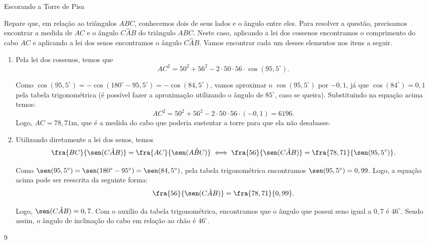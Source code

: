 \begin{answer}{Escorando a Torre de Pisa}
{
Repare que, em relação ao triângulos $ABC$, conhecemos dois de seus lados e o ângulo entre eles. Para resolver a questão, precisamos encontrar a medida de $AC$ e o ângulo $C\hat{A}B$ do triângulo $ABC$. Neste caso,  aplicando a lei dos cossenos encontramos o comprimento do cabo $AC$ e aplicando a lei dos senos encontramos o ângulo $C\hat{A}B$. Vamos encontrar cada um desses elementos nos itens a seguir.

\begin{enumerate}
    \item{}
    Pela lei dos cossenos, temos que 
    $$AC^2=50^2+56^2-2\cdot50\cdot56\cdot\cos(95,5^\circ).$$
    
    Como $\cos(95,5^\circ)=-\cos(180^\circ-95,5^\circ)=-\cos(84,5^\circ)$, vamos aproximar o $\cos(95,5^\circ)$ por $-0,1$, já que $\cos(84^\circ)=0,1$ pela tabela trigonométrica (é possível fazer a aproximação utilizando o ângulo de $85^\circ$, caso se queira). Substituindo na equação acima temos:
    $$AC^2=50^2+56^2-2\cdot50\cdot56\cdot(-0,1)=6196.$$
    Logo, $AC=78,71$m, que é a medida do cabo que poderia sustentar a torre para que ela não desabasse.
 
    \item{} 
    Utilizando diretamente a lei dos senos, temos
    $$\fra{BC}{\sen(C\hat{A}B)}=\fra{AC}{\sen(A\hat{B}C)} \iff \fra{56}{\sen (C\hat{A}B)}=\fra{78,71}{\sen(95,5^\circ)}.$$
    
    Como $\sen(95,5^\circ)=\sen(180^\circ-95^\circ)=\sen(84,5^\circ)$, pela tabela trigonométrica encontramos $\sen(95,5^\circ)=0,99$. Logo, a equação acima pode ser reescrita da seguinte forma:
    $$\fra{56}{\sen(C\hat{A}B)}=\fra{78,71}{0,99}.$$
    
    Logo, $\sen(C\hat{A}B)=0,7$. Com o auxílio da tabela trigonométrica, encontramos que o ângulo que possui seno igual a $0,7$ é $46^\circ$. Sendo assim, o ângulo de inclinação do cabo em relação ao chão é $46^\circ$.
\end{enumerate}
}{9}
\end{answer}
\def\currentcolor{session4}

